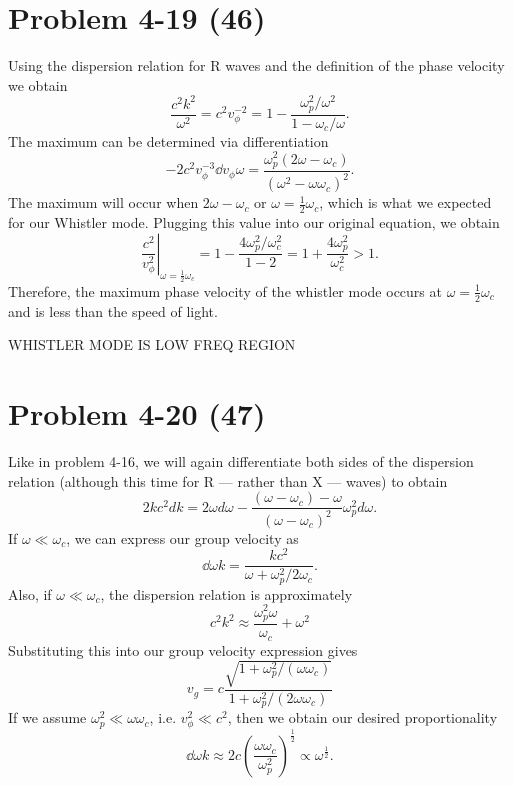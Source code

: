 \section*{Problem 4-19 (46)}
\label{sec:4-19}
Using the dispersion relation for R waves and the definition of the phase velocity we obtain
\begin{equation*}
	\dfrac{c^2k^2}{\omega^2} = c^2v_\phi^{-2} = 1 - \dfrac{\omega_p^2/\omega^2}{1 - \omega_c/\omega}.
\end{equation*}
The maximum can be determined via differentiation
\begin{equation*}
	-2c^2v_\phi^{-3}\dd{v_\phi}{\omega} = \dfrac{\omega_p^2(2\omega - \omega_c)}{\left(\omega^2 - \omega\omega_c\right)^2}.
\end{equation*}
The maximum will occur when \(2\omega - \omega_c \) or \(\omega = \frac{1}{2}\omega_c \), which is what we expected for our Whistler mode. 
Plugging this value into our original equation, we obtain
\begin{equation*}
	\left.\dfrac{c^2}{v^2_\phi}\right|_{\omega = \frac{1}{2}\omega_c} = 1 - \dfrac{4\omega_p^2/\omega_c^2}{1 - 2} = 1 + \dfrac{4\omega_p^2}{\omega_c^2} > 1.
\end{equation*}
Therefore, the maximum phase velocity of the whistler mode occurs at \(\omega = \frac{1}{2}\omega_c\) and is less than the speed of light. 

WHISTLER MODE IS LOW FREQ REGION

\section*{Problem 4-20 (47)}
\label{sec:4-20}
Like in problem 4-16, we will again differentiate both sides of the dispersion relation (although this time for R --- rather than X --- waves) to obtain
\begin{equation*}
	2kc^2dk = 2\omega d\omega - \dfrac{(\omega - \omega_c) - \omega}{(\omega - \omega_c)^2}\omega_p^2d\omega.
\end{equation*}
If \(\omega \ll \omega_c \), we can express our group velocity as
\begin{equation*}
	\dd{\omega}{k} = \dfrac{kc^2}{\omega + \omega_p^2/2\omega_c}.
\end{equation*}
Also, if \(\omega \ll \omega_c \), the dispersion relation is approximately
\begin{equation*}
	c^2k^2 \approx \dfrac{\omega^2_p\omega}{\omega_c} + \omega^2
\end{equation*}
Substituting this into our group velocity expression gives
\begin{equation*}
	v_g = c\dfrac{\sqrt{1 + \omega_p^2/(\omega\omega_c)}}{1 + \omega_p^2/(2\omega\omega_c)}
\end{equation*}
If we assume \(\omega_p^2 \ll \omega\omega_c \), i.e. \(v_\phi^2 \ll c^2 \), then we obtain our desired proportionality
\begin{equation*}
	\dd{\omega}{k} \approx 2c\left(\dfrac{\omega\omega_c}{\omega_p^2}\right)^{\frac{1}{2}} \propto \omega^{\frac{1}{2}}.
\end{equation*}

